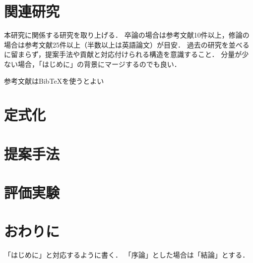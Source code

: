 \documentclass[a4paper,11ptj,dvipdfmx]{jsreport} %
\begin{document}


\chapter{関連研究}\label{RelatedWork}
本研究に関係する研究を取り上げる．
卒論の場合は参考文献10件以上，修論の場合は参考文献25件以上（半数以上は英語論文）が目安．
過去の研究を並べるに留まらず，提案手法や貢献と対応付けられる構造を意識すること．
分量が少ない場合，「はじめに」の背景にマージするのでも良い．

参考文献はBibTeXを使うとよい

\chapter{定式化}

\chapter{提案手法}

\chapter{評価実験}


\chapter{おわりに}\label{Conclusion}
「はじめに」と対応するように書く．
「序論」とした場合は「結論」とする．


\end{document}
